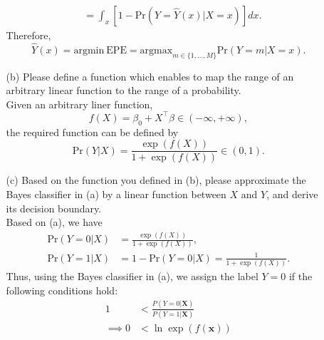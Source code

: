 \documentclass[10pt]{article}
\begin{document}
\begin{enumerate}[1.]
\begin{itemize}
{\begin{align*}
                                   & =\int_{x} \left[ 1 - \text{Pr}\left(Y = \hat{Y}(x) | X=x\right) \right] dx.
                    \end{align*}
                    Therefore,
                    \begin{equation*}
                        \hat{Y}(x) = \text{argmin}\ \text{EPE} = \text{argmax}_{m \in \{ 1,...,M\}} \text{Pr}(Y=m|X=x).
                    \end{equation*}
                    }
              \item[(b)] Please define a function which enables to map the range of an arbitrary linear function to the range of a probability. ~ \\
                    {\color{blue}
                    Given an arbitrary liner function,
                    \begin{equation*}
                        f(X) = \beta_0 + X^\top \beta \in (-\infty,+\infty),
                    \end{equation*}
                    the required function can be defined by
                    \begin{equation*}
                        \text{Pr}(Y|X) = \frac{\exp(f(X))}{1 + \exp(f(X))} \in (0,1).
                    \end{equation*}
                    }
              \item[(c)] Based on the function you defined in (b), please approximate the Bayes classifier in (a)
                    by a linear function between $X$ and $Y$, and derive its decision boundary. ~\\
                    {\color{blue}
                    Based on (a), we have
                    \begin{align*}
                        \text{Pr}(Y=0|X) & = \frac{\exp(f(X))}{1 + \exp(f(X))},              \\
                        \text{Pr}(Y=1|X) & = 1- \text{Pr}(Y=0|X) = \frac{1}{1 + \exp(f(X))}.
                    \end{align*}
                    Thus, using the Bayes classifier in (a), we assign the label $Y = 0$
                    if the following conditions hold:
                    \begin{align*}
                        1          & < \frac{P(Y=0 | \boldsymbol{X})}{P(Y=1 | \boldsymbol{X})} \\
                        \implies 0 & < \ln \exp(f(\boldsymbol{{x}}))                           \\

\end{align*}}
\end{itemize}
\end{enumerate}
\end{document}
